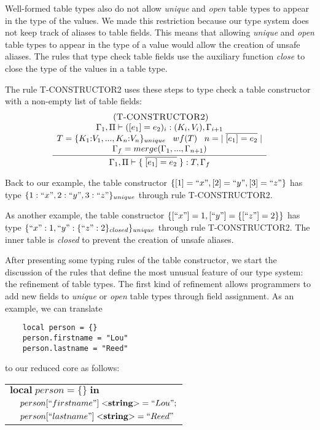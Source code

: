 \documentclass{sigplanconf}
\newcommand{\String}{\mathbf{string}}
\newcommand{\mylabel}[1]{\; (\textsc{#1})}
\newcommand{\env}{\Gamma}
\newcommand{\penv}{\Pi}
\begin{document}
Well-formed table types also do not allow \emph{unique} and
\emph{open} table types to appear in the type of the values.
We made this restriction because our type system does not keep
track of aliases to table fields.
This means that allowing \emph{unique} and \emph{open} table
types to appear in the type of a value would allow the
creation of unsafe aliases.
The rules that type check table fields use the auxiliary function
\emph{close} to close the type of the values in a table type.

The rule \textsc{T-CONSTRUCTOR2} uses these steps to type check a
table constructor with a non-empty list of table fields:
\[
\begin{array}{c}
\mylabel{T-CONSTRUCTOR2}\\
\dfrac{\begin{array}{c}
       \env_{1}, \penv \vdash ([e_{1}] = e_{2})_{i}:(K_{i},V_{i}), \env_{i+1} \\
       T = \{K_{1}{:}V_{1}, ..., K_{n}{:}V_{n}\}_{unique} \;\;\;
       wf(T) \;\;\;
       n = |\;\overline{[e_{1}] = e_{2}}\;| \\
       \env_{f} = merge(\env_{1}, ..., \env_{n+1})
       \end{array}}
      {\env_{1}, \penv \vdash \{\;\overline{[e_{1}] = e_{2}}\;\}:T, \env_{f}}
\end{array}
\]

Back to our example, the table constructor
$\{ [1] = ``x", [2] = ``y", [3] = ``z" \}$ has type
$\{1:``x", 2:``y", 3:``z"\}_{unique}$ through rule \textsc{T-CONSTRUCTOR2}.

As another example, the table constructor $\{[``x"] = 1, [``y"] = \{[``z"] = 2\}\}$
has type $\{``x":1, ``y":\{``z":2\}_{closed}\}_{unique}$ through rule
\textsc{T-CONSTRUCTOR2}.
The inner table is \emph{closed} to prevent the creation of unsafe aliases.

After presenting some typing rules of the table constructor,
we start the discussion of the rules that define the most
unusual feature of our type system: the refinement of table types.
The first kind of refinement allows programmers to add new
fields to \emph{unique} or \emph{open} table types through
field assignment.
As an example, we can translate
\begin{verbatim}
    local person = {}
    person.firstname = "Lou"
    person.lastname = "Reed"
\end{verbatim}
to our reduced core as follows:
\begin{center}
\begin{tabular}{ll}
\multicolumn{2}{l}{$\mathbf{local} \; person = \{\} \; \mathbf{in}$}\\
& \multicolumn{1}{l}{$person[``firstname"] \; {<}\String{>} = ``Lou";$}\\
& \multicolumn{1}{l}{$person[``lastname"] \; {<}\String{>} = ``Reed"$}
\end{tabular}
\end{center}
\end{document}
